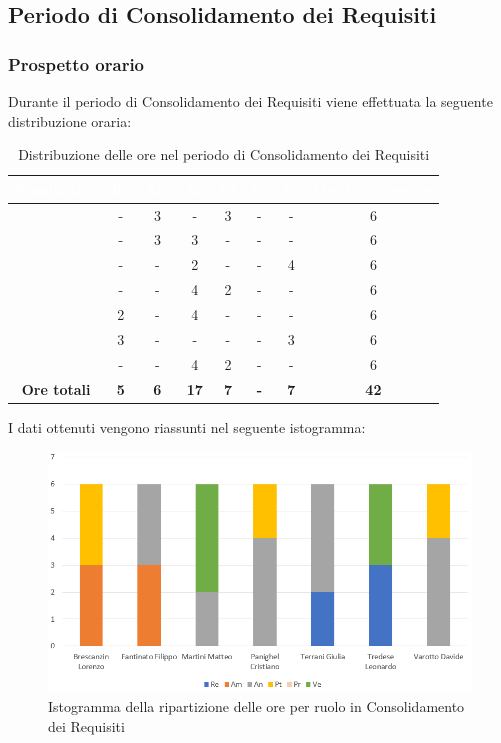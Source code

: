 \subsection{Periodo di Consolidamento dei Requisiti}
\subsubsection{Prospetto orario}
Durante il periodo di Consolidamento dei Requisiti viene effettuata la seguente distribuzione oraria:
\begin{table}[H]
	\begin{center}
		\begin{tabular}{ |c c c c c c c c| }
		\rowcolor{darkblue} 
		\textcolor{white}{\textbf{Nominativo}} & \textcolor{white}{\textbf{Re}} & \textcolor{white}{\textbf{Am}} & \textcolor{white}{\textbf{An}} & \textcolor{white}{\textbf{Pt}} & \textcolor{white}{\textbf{Pr}} & \textcolor{white}{\textbf{Ve}} & \textcolor{white}{\textbf{Ore Complessive}} \\ \hline
		\BL 	& - 	& 3  	& - 	& 3 	& - 	& - 	& 6 \\ \hline
		\FF 	& - 	& 3  	& 3 	& - 	& - 	& -  	& 6 \\ \hline
		\MM 	& -  	& -  	& 2 	& - 	& - 	& 4  	& 6 \\ \hline
		\PC 	& - 	& -  	& 4 	& 2 	& - 	& - 	& 6 \\ \hline
		\TG 	& 2  	& - 	& 4 	& - 	& - 	& - 	& 6 \\ \hline
		\TL 	& 3  	& - 	& - 	& - 	& - 	& 3 	& 6 \\ \hline
		\VD 	& -  	& -  	& 4 	& 2 	& - 	& -  	& 6 \\ \hline
		\textbf{Ore totali} & \textbf{5} & \textbf{6} & \textbf{17} & \textbf{7} & \textbf{-} & \textbf{7} & \textbf{42} \\ \hline
		\end{tabular}
	\caption{Distribuzione delle ore nel periodo di Consolidamento dei Requisiti}
	\end{center}
\end{table}
I dati ottenuti vengono riassunti nel seguente istogramma:
\begin{figure}[H]
    \centering
    \includegraphics[scale = 0.70]{Immagini/ConsolidamentoIsto.png}
    \caption{Istogramma della ripartizione delle ore per ruolo in Consolidamento dei Requisiti}
    \label{fig:istogramma ripartizione ore, periodo di Consolidamento dei Requisiti}
\end{figure}
\newpage
